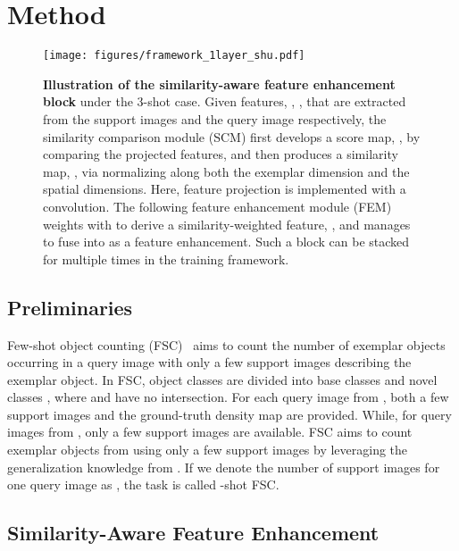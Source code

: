 \documentclass[10pt,twocolumn,letterpaper]{article}
\begin{document}
 \section{Method}\label{sec:method}


\begin{figure*}[t]
    \centering
    \texttt{[image: figures/framework\_1layer\_shu.pdf]}
    \vspace{-3pt}
    \caption{
        \textbf{Illustration of the similarity-aware feature enhancement block} under the 3-shot case.
Given features, , , that are extracted from the support images and the query image respectively, the similarity comparison module (SCM) first develops a score map, , by comparing the projected features, and then produces a similarity map, , via normalizing  along both the exemplar dimension and the spatial dimensions.
Here, feature projection is implemented with a  convolution.
The following feature enhancement module (FEM) weights  with  to derive a similarity-weighted feature, , and manages to fuse  into  as a feature enhancement. 
Such a block can be stacked for multiple times in the training framework. 
    }
    \label{fig:framework}
    \vspace{-15pt}
\end{figure*}


\subsection{Preliminaries}\label{subsec:preliminaries}


Few-shot object counting (FSC)~\cite{famnet} aims to count the number of exemplar objects occurring in a query image with only a few support images describing the exemplar object. 
In FSC, object classes are divided into base classes  and novel classes , where  and  have no intersection. 
For each query image from , both a few support images and the ground-truth density map are provided. 
While, for query images from , only a few support images are available. 
FSC aims to count exemplar objects from  using only a few support images by leveraging the generalization knowledge from . 
If we denote the number of support images for one query image as , the task is called -shot FSC. 


\subsection{Similarity-Aware Feature Enhancement}\label{subsec:core-block}
\end{document}
